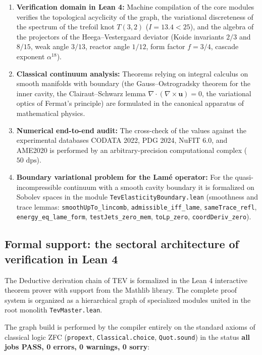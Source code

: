 \documentclass[11pt,a4paper]{article}
\theoremstyle{definition}
\theoremstyle{remark}
\begin{document}
\begin{enumerate}
	\item \textbf{Verification domain in Lean 4:} Machine compilation of the core modules verifies the topological acyclicity of the graph, the variational discreteness of the spectrum of the trefoil knot $T(3,2)$ ($I = 13.4 < 25$), and the algebra of the projectors of the Heega--Vestergaard deviator (Koide invariants $2/3$ and $8/15$, weak angle $3/13$, reactor angle $1/12$, form factor $f = 3/4$, cascade exponent $\alpha^{18}$).
	\item \textbf{Classical continuum analysis:} Theorems relying on integral calculus on smooth manifolds with boundary (the Gauss--Ostrogradsky theorem for the inner cavity, the Clairaut--Schwarz lemma $\nabla \cdot (\nabla \times \mathbf{u}) = 0$, the variational optics of Fermat's principle) are formulated in the canonical apparatus of mathematical physics.
	\item \textbf{Numerical end-to-end audit:} The cross-check of the values against the experimental databases CODATA 2022, PDG 2024, NuFIT 6.0, and AME2020 is performed by an arbitrary-precision computational complex ($50\text{ dps}$).
	\item \textbf{Boundary variational problem for the Lamé operator:}  For the quasi-incompressible continuum with a smooth cavity boundary it is formalized on Sobolev spaces in the module \texttt{TevElasticityBoundary.lean} (smoothness and trace lemmas: \texttt{smoothUpTo_lincomb}, \texttt{admissible_iff_lame}, \texttt{sameTrace_refl}, \texttt{energy_eq_lame_form}, \texttt{testJets_zero_mem}, \texttt{toLp_zero}, \texttt{coordDeriv_zero}).
\end{enumerate}

\subsection*{Formal support: the sectoral architecture of verification in Lean 4}

The Deductive derivation chain of TEV is formalized in the Lean 4 interactive theorem prover with support from the Mathlib library. The complete proof system is organized as a hierarchical graph of specialized modules united in the root monolith \texttt{TevMaster.lean}.

The graph build is performed by the compiler entirely on the standard axioms of classical logic ZFC (\texttt{propext}, \texttt{Classical.choice}, \texttt{Quot.sound}) in the status \textbf{all jobs PASS, 0 errors, 0 warnings, 0 sorry}:
\end{document}
